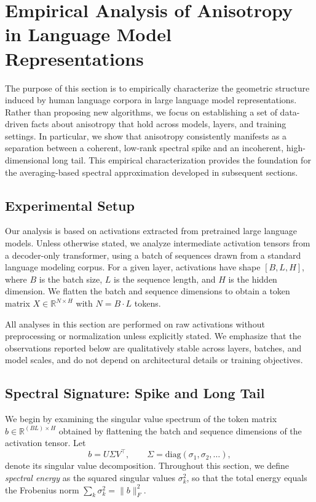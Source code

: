 \section{Empirical Analysis of Anisotropy in Language Model Representations}

The purpose of this section is to empirically characterize the geometric structure
induced by human language corpora in large language model representations.
Rather than proposing new algorithms, we focus on establishing a set of
data-driven facts about anisotropy that hold across models, layers, and training
settings.
In particular, we show that anisotropy consistently manifests as a separation
between a coherent, low-rank spectral spike and an incoherent, high-dimensional
long tail.
This empirical characterization provides the foundation for the averaging-based
spectral approximation developed in subsequent sections.

\subsection{Experimental Setup}

Our analysis is based on activations extracted from pretrained large language
models.
Unless otherwise stated, we analyze intermediate activation tensors from a
decoder-only transformer, using a batch of sequences drawn from a standard
language modeling corpus.
For a given layer, activations have shape $[B, L, H]$, where $B$ is the batch
size, $L$ is the sequence length, and $H$ is the hidden dimension.
We flatten the batch and sequence dimensions to obtain a token matrix
$X \in \mathbb{R}^{N \times H}$ with $N = B \cdot L$ tokens.

All analyses in this section are performed on raw activations without
preprocessing or normalization unless explicitly stated.
We emphasize that the observations reported below are qualitatively stable across
layers, batches, and model scales, and do not depend on architectural details or
training objectives.

\subsection{Spectral Signature: Spike and Long Tail}
\label{subsec:spike_long_tail}

We begin by examining the singular value spectrum of the token matrix
$b \in \mathbb{R}^{(BL)\times H}$ obtained by flattening the batch and sequence
dimensions of the activation tensor.
Let
\[
b = U \Sigma V^\top,
\qquad
\Sigma = \mathrm{diag}(\sigma_1,\sigma_2,\dots),
\]
denote its singular value decomposition.
Throughout this section, we define \emph{spectral energy} as the squared singular
values $\sigma_k^2$, so that the total energy equals the Frobenius norm
$\sum_k \sigma_k^2 = \|b\|_F^2$.

